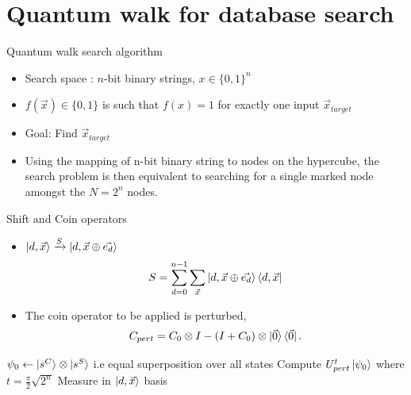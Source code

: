 \documentclass[10pt]{beamer}
\begin{document}
\section{Quantum walk for database search}
\begin{frame}{Quantum walk search algorithm}
    \begin{itemize}
        \item Search space : $n$-bit binary strings, $x \in \{0,1\}^n$
        \item $f(\vec{x}) \in \{0,1\}$ is such that $f(x) = 1$ for exactly one input $\vec{x}_{target}$
        \item Goal: Find $\vec{x}_{target}$ 
        \item Using the mapping of n-bit binary string to nodes on the hypercube, the search problem is then equivalent to searching for a single marked node amongst the $N = 2^n$ nodes.
    \end{itemize}
\end{frame}

\begin{frame}{Shift and Coin operators}

    \begin{itemize}
        \item $\ket{d, \vec{x}} \xrightarrow{S} \ket{d, \vec{x} \oplus \vec{e_d}}$
            \begin{equation}
            S = \sum_{d=0}^{n-1}{\sum_{\vec{x}}{
            \ket{d, \vec{x} \oplus \vec{e_d}}\bra{d, \vec{x}}}}    
        \end{equation}
        \item The coin operator to be applied is perturbed, 
        \begin{equation}
            C_{pert} = C_0 \otimes I - \left(I +
            C_0\right)\otimes\ket{\vec{0}}\bra{\vec{0}}.
        \end{equation}
    \end{itemize}
    
    \begin{algorithm}[H]
    \caption{Search with coin oracle}\label{alg:q1}
    \begin{algorithmic}[1]
    \State $\psi_0 \gets \ket{s^C} \otimes \ket{s^S}$ i.e equal superposition over all states
    \State Compute $U_{pert}^t \ket{\psi_0}$ where $t =\frac{\pi}{2}\sqrt{2^n}$
    \State Measure in $\ket{d,\vec{x}}$ basis
    \EndProcedure
    \end{algorithmic}
    \end{algorithm}
\end{frame}
\end{document}
